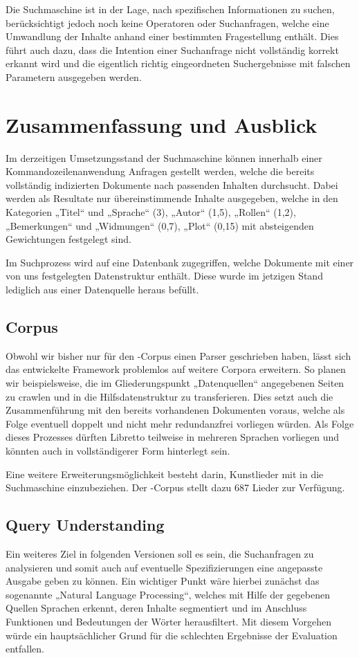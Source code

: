 Die Suchmaschine ist in der Lage, nach spezifischen Informationen zu suchen,
berücksichtigt jedoch noch keine Operatoren oder Suchanfragen,
welche eine Umwandlung der Inhalte
anhand einer bestimmten Fragestellung enthält.
Dies führt auch dazu, dass die Intention einer Suchanfrage
nicht vollständig korrekt erkannt wird
und die eigentlich richtig eingeordneten Suchergebnisse
mit falschen Parametern ausgegeben werden.

\section{Zusammenfassung und Ausblick}
Im derzeitigen Umsetzungsstand der Suchmaschine
können innerhalb einer Kommandozeilenanwendung Anfragen gestellt werden,
welche die bereits vollständig indizierten Dokumente
nach passenden Inhalten durchsucht.
Dabei werden als Resultate nur übereinstimmende Inhalte ausgegeben,
welche in den Kategorien „Titel“ und „Sprache“ (3), „Autor“ (1,5),
„Rollen“ (1,2), „Bemerkungen“ und „Widmungen“ (0,7), „Plot“ (0,15)
mit absteigenden Gewichtungen festgelegt sind.

Im Suchprozess wird auf eine Datenbank zugegriffen,
welche Dokumente mit einer von uns festgelegten Datenstruktur enthält.
Diese wurde im jetzigen Stand lediglich aus einer Datenquelle heraus befüllt.

\subsection{Corpus}
Obwohl wir bisher nur für den -Corpus
einen Parser geschrieben haben,
lässt sich das entwickelte Framework problemlos auf weitere Corpora erweitern.
So planen wir beispielsweise,
die im Gliederungspunkt „Datenquellen“ angegebenen Seiten zu crawlen
und in die Hilfsdatenstruktur zu transferieren.
Dies setzt auch die Zusammenführung
mit den bereits vorhandenen Dokumenten voraus,
welche als Folge eventuell doppelt
und nicht mehr redundanzfrei vorliegen würden.
Als Folge dieses Prozesses dürften Libretto teilweise
in mehreren Sprachen vorliegen
und könnten auch in vollständigerer Form hinterlegt sein.

Eine weitere Erweiterungsmöglichkeit besteht darin,
Kunstlieder mit in die Suchmaschine einzubeziehen.
Der -Corpus stellt dazu 687 Lieder zur Verfügung.

\subsection{Query Understanding}
Ein weiteres Ziel in folgenden Versionen soll es sein,
die Suchanfragen zu analysieren
und somit auch auf eventuelle Spezifizierungen
eine angepasste Ausgabe geben zu können.
Ein wichtiger Punkt wäre hierbei zunächst
das sogenannte „Natural Language Processing“,
welches mit Hilfe der gegebenen Quellen Sprachen erkennt,
deren Inhalte segmentiert und im Anschluss Funktionen
und Bedeutungen der Wörter herausfiltert.
Mit diesem Vorgehen würde ein hauptsächlicher Grund
für die schlechten Ergebnisse der Evaluation entfallen.

